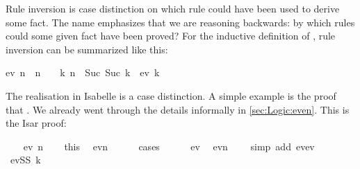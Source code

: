 \begin{isabellebody}
\begin{isamarkuptext}
Rule inversion is case distinction on which rule could have been used to
derive some fact. The name  emphasizes that we are
reasoning backwards: by which rules could some given fact have been proved?
For the inductive definition of , rule inversion can be summarized
like this:
\begin{isabelle}%
ev\ n\ {}\ n\ {}\ {}\ {}\ {}{}k{}\ n\ {}\ Suc\ {}Suc\ k{}\ {}\ ev\ k{}%
\end{isabelle}
The realisation in Isabelle is a case distinction.
A simple example is the proof that . We
already went through the details informally in \autoref{sec:Logic:even}. This
is the Isar proof:%
\end{isamarkuptext}%
\isamarkuptrue%
%
\isadelimproof
%
\endisadelimproof
%
\isatagproof
\ \ \isamarkupfalse%
\ {}ev\ n{}\isanewline
\ \ \isamarkupfalse%
\ this\ \isamarkupfalse%
\ {}ev{}n\ {}\ {}{}{}\isanewline
\ \ \isamarkupfalse%
\ cases\isanewline
\ \ \ \ \isamarkupfalse%
\ ev{}\ \isamarkupfalse%
\ {}ev{}n\ {}\ {}{}{}\ \isamarkupfalse%
\ {}simp\ add{}\ ev{}ev{}{}\isanewline
\ \ \isamarkupfalse%
\isanewline
\ \ \ \ \isamarkupfalse%
\ {}evSS\ k{}\ \isamarkupfalse%

\end{isabellebody}
